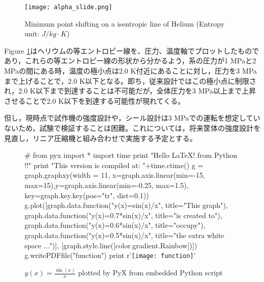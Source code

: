 \begin{figure}[h]
\begin{center}
\texttt{[image: alpha\_slide.png]}
\caption{Minimum point shifting on a isentropic line of Helium (Entropy unit: $J/kg\cdot K$)}
\label{fig:alpha_slide}
\end{center}
\end{figure}

Figure \ref{fig:alpha_slide}はヘリウムの等エントロピー線を、圧力、温度軸でプロットしたものであり，これらの等エントロピー線の形状から分かるよう，系の圧力が1 MPaと2 MPaの間にある時，温度の極小点は2.0 K付近にあることに対し，圧力を3 MPaまで上げることで，2.0 K以下となる。即ち，従来設計ではこの極小点に制限され，2.0 K以下まで到達することは不可能だが，全体圧力を3 MPa以上まで上昇させることで2.0 K以下を到達する可能性が現れてくる。

但し，現時点で試作機の強度設計や，シール設計は3 MPaでの運転を想定していないため，試験で検証することは困難。これについては，将来筐体の強度設計を見直し，リニア圧縮機と組み合わせで実施する予定とする。

\begin{figure}
\centering
\begin{python}
#
from pyx import *
import time
print "Hello \LaTeX! from Python !!"
print "This version is compiled at: "+time.ctime()
g = graph.graphxy(width = 11, x=graph.axis.linear(min=-15, max=15),y=graph.axis.linear(min=-0.25, max=1.5), key=graph.key.key(pos="tr", dist=0.1))
g.plot([graph.data.function("y(x)=sin(x)/x", title="This graph"),
graph.data.function("y(x)=0.7*sin(x)/x", title="is created to"),
graph.data.function("y(x)=0.6*sin(x)/x", title="occupy"),
graph.data.function("y(x)=0.5*sin(x)/x", title="the extra white space ...")], 
[graph.style.line([color.gradient.Rainbow])])
g.writePDFfile("function")
print r'\texttt{[image: function]}'
\end{python}
\caption*{$y(x)=\frac{\sin(x)}{x}$ plotted by PyX from embedded Python script}
\end{figure}

